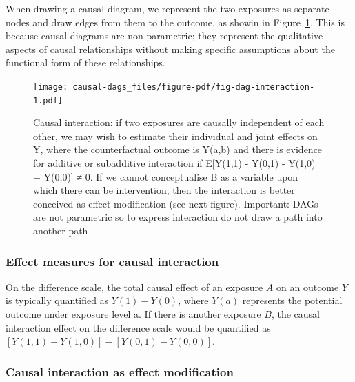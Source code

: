\documentclass[
  singlecolumn]{report}
\begin{document}
When drawing a causal diagram, we represent the two exposures as
separate nodes and draw edges from them to the outcome, as showin in
Figure~\ref{fig-dag-interaction}. This is because causal diagrams are
non-parametric; they represent the qualitative aspects of causal
relationships without making specific assumptions about the functional
form of these relationships.

\begin{figure}

{\centering \texttt{[image: causal-dags\_files/figure-pdf/fig-dag-interaction-1.pdf]}

}

\caption{\label{fig-dag-interaction}Causal interaction: if two exposures
are causally independent of each other, we may wish to estimate their
individual and joint effects on Y, where the counterfactual outcome is
Y(a,b) and there is evidence for additive or subadditive interaction if
E{[}Y(1,1) - Y(0,1) - Y(1,0) + Y(0,0){]} ≠ 0. If we cannot conceptualise
B as a variable upon which there can be intervention, then the
interaction is better conceived as effect modification (see next
figure). Important: DAGs are not parametric so to express interaction do
not draw a path into another path}

\end{figure}

\hypertarget{effect-measures-for-causal-interaction}{%
\subsubsection{\texorpdfstring{\textbf{Effect measures for causal
interaction}}{Effect measures for causal interaction}}\label{effect-measures-for-causal-interaction}}

On the difference scale, the total causal effect of an exposure \(A\) on
an outcome \(Y\) is typically quantified as \(Y(1) - Y(0)\), where
\(Y(a)\) represents the potential outcome under exposure level a. If
there is another exposure \(B\), the causal interaction effect on the
difference scale would be quantified as
\([Y(1,1) - Y(1,0)] - [Y(0,1) - Y(0,0)]\).

\hypertarget{causal-interaction-as-effect-modification}{%
\subsubsection{\texorpdfstring{\textbf{Causal interaction as effect
modification}}{Causal interaction as effect modification}}\label{causal-interaction-as-effect-modification}}
\end{document}

